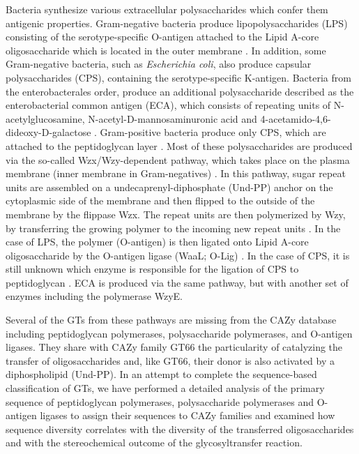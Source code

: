 \documentclass{article}
\begin{document}
Bacteria synthesize various extracellular polysaccharides which confer them antigenic properties. Gram-negative bacteria produce lipopolysaccharides (LPS) consisting of the serotype-specific O-antigen attached to the Lipid A-core oligosaccharide which is located in the outer membrane \cite{di_lorenzo_journey_2022}. In addition, some Gram-negative bacteria, such as \textit{Escherichia coli}, also produce capsular polysaccharides (CPS), containing the serotype-specific K-antigen. Bacteria from the enterobacterales order, produce an additional polysaccharide described as the enterobacterial common antigen (ECA), which consists of repeating units of N-acetylglucosamine, N-acetyl-D-mannosaminuronic acid and 4-acetamido-4,6-dideoxy-D-galactose \cite{rai_enterobacterial_2020}. Gram-positive bacteria produce only CPS, which are attached to the peptidoglycan layer \cite{paton_streptococcus_2019}. Most of these polysaccharides are produced via the so-called Wzx/Wzy-dependent pathway, which takes place on the plasma membrane (inner membrane in Gram-negatives) \cite{islam_synthesis_2014}. In this pathway, sugar repeat units are assembled on a undecaprenyl-diphosphate (Und-PP) anchor on the cytoplasmic side of the membrane and then flipped to the outside of the membrane by the flippase Wzx. The repeat units are then polymerized by Wzy, by transferring the growing polymer to the incoming new repeat units \cite{islam_synthesis_2014}. In the case of LPS, the polymer (O-antigen) is then ligated onto Lipid A-core oligosaccharide by the O-antigen ligase (WaaL; O-Lig) \cite{ruan_waal_2012}. In the case of CPS, it is still unknown which enzyme is responsible for the ligation of CPS to peptidoglycan \cite{paton_streptococcus_2019}. ECA is produced via the same pathway, but with another set of enzymes including the polymerase WzyE.

Several of the GTs from these pathways are missing from the CAZy database including peptidoglycan polymerases, polysaccharide polymerases, and O-antigen ligases. They share with CAZy family GT66 the particularity of catalyzing the transfer of oligosaccharides and, like GT66, their donor is also activated by a diphospholipid (Und-PP). In an attempt to complete the sequence-based classification of GTs, we have performed a detailed analysis of the primary sequence of peptidoglycan polymerases, polysaccharide polymerases and O-antigen ligases to assign their sequences to CAZy families and examined how sequence diversity correlates with the diversity of the transferred oligosaccharides and with the stereochemical outcome of the glycosyltransfer reaction.
\end{document}
